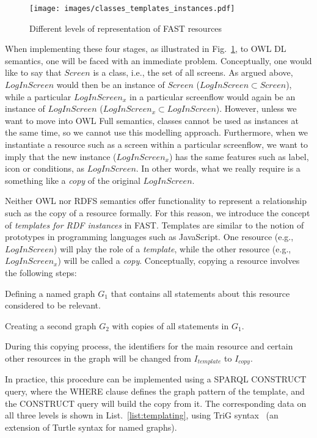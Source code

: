 \documentclass[twoside]{fast_latex}
\begin{document}
\begin{figure}
  \begin{center}
    \texttt{[image: images/classes\_templates\_instances.pdf]}
    \caption{Different levels of representation of FAST resources}
    \label{fig:classes_templates}
  \end{center}
\end{figure}

When implementing these four stages, as illustrated in Fig.~\ref{fig:classes_templates}, to OWL DL semantics, one will be faced with an immediate problem. Conceptually, one would like to say that $Screen$ is a class, i.e., the set of all screens. As argued above, $LogInScreen$ would then be an instance of $Screen$ ($LogInScreen \subset Screen$), while a particular $LogInScreen_x$ in a particular screenflow would again be an instance of $LogInScreen$ ($LogInScreen_x \subset LogInScreen$). However, unless we want to move into OWL Full semantics, classes cannot be used as instances at the same time, so we cannot use this modelling approach. Furthermore, when we instantiate a resource such as a screen within a particular screenflow, we want to imply that the new instance ($LogInScreen_x$) has the same features such as label, icon or conditions, as $LogInScreen$. In other words, what we really require is a something like a \emph{copy} of the original $LogInScreen$. 

Neither OWL nor RDFS semantics offer functionality to represent a relationship such as the copy of a resource formally. For this reason, we introduce the concept of \emph{templates for RDF instances} in FAST. Templates are similar to the notion of prototypes in programming languages such as JavaScript. One resource (e.g., $LogInScreen$) will play the role of a \emph{template}, while the other resource (e.g., $LogInScreen_x$) will be called a \emph{copy}. Conceptually, copying a resource involves the following steps:
\begin{inparaenum}[(i)]
	\item Defining a named graph $G_1$ that contains all statements about this resource considered to be relevant.
	\item Creating a second graph $G_2$ with copies of all statements in $G_1$.
	\item During this copying process, the identifiers for the main resource and certain other resources in the graph will be changed from $I_{template}$ to $I_{copy}$.
\end{inparaenum}	
In practice, this procedure can be implemented using a SPARQL CONSTRUCT query, where the WHERE clause defines the graph pattern of the template, and the CONSTRUCT query will build the copy from it. The corresponding data on all three levels is shown in List.~\ref{list:templating}, using TriG syntax~\cite{bizer2004trig} (an extension of Turtle syntax for named graphs).
\end{document}
